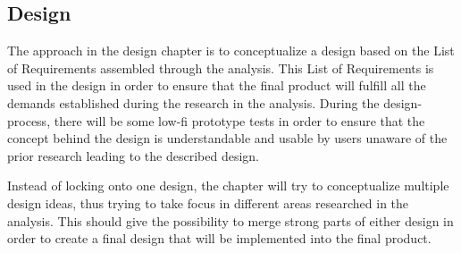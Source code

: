 \subsection{Design}
The approach in the design chapter is to conceptualize a design based on the List of Requirements assembled through the analysis. This List of Requirements is used in the design in order to ensure that the final product will fulfill all the demands established during the research in the analysis. During the design-process, there will be some low-fi prototype tests in order to ensure that the concept behind the design is understandable and usable by users unaware of the prior research leading to the described design.
 
Instead of locking onto one design, the chapter will try to conceptualize multiple design ideas, thus trying to take focus in different areas researched in the analysis. This should give the possibility to merge strong parts of either design in order to create a final design that will be implemented into the final product.
